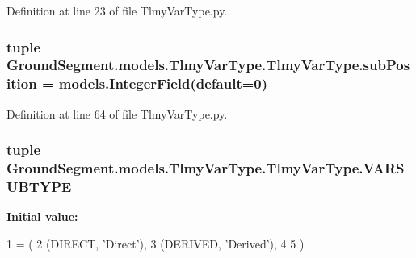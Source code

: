Definition at line 23 of file Tlmy\+Var\+Type.\+py.

\hypertarget{class_ground_segment_1_1models_1_1_tlmy_var_type_1_1_tlmy_var_type_a5058fd500a0d206e5442dd8d6b5c038c}{}
\subsubsection[{sub\+Position}]{\setlength{\rightskip}{0pt plus 5cm}tuple Ground\+Segment.\+models.\+Tlmy\+Var\+Type.\+Tlmy\+Var\+Type.\+sub\+Position = models.\+Integer\+Field(default=0)\hspace{0.3cm}{\ttfamily [static]}}\label{class_ground_segment_1_1models_1_1_tlmy_var_type_1_1_tlmy_var_type_a5058fd500a0d206e5442dd8d6b5c038c}


Definition at line 64 of file Tlmy\+Var\+Type.\+py.

\hypertarget{class_ground_segment_1_1models_1_1_tlmy_var_type_1_1_tlmy_var_type_a4d07d8c0064f8f2d2edbfb5b53001d9b}{}
\subsubsection[{V\+A\+R\+S\+U\+B\+T\+Y\+P\+E}]{\setlength{\rightskip}{0pt plus 5cm}tuple Ground\+Segment.\+models.\+Tlmy\+Var\+Type.\+Tlmy\+Var\+Type.\+V\+A\+R\+S\+U\+B\+T\+Y\+P\+E\hspace{0.3cm}{\ttfamily [static]}}\label{class_ground_segment_1_1models_1_1_tlmy_var_type_1_1_tlmy_var_type_a4d07d8c0064f8f2d2edbfb5b53001d9b}
{\bfseries Initial value\+:}
\begin{DoxyCode}
1 = (
2         (DIRECT, \textcolor{stringliteral}{'Direct'}),
3         (DERIVED, \textcolor{stringliteral}{'Derived'}),
4         
5     )
\end{DoxyCode}


